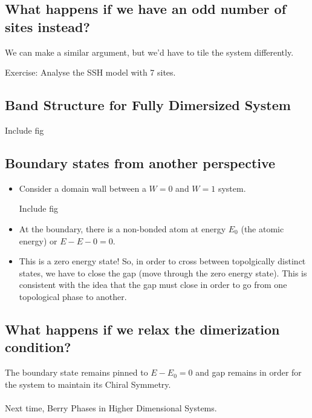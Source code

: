 \documentclass[11pt]{article}
\begin{document}
\subsection*{What happens if we have an odd number of sites instead?} We can make a similar argument, but we'd have to tile the system differently. \begin{note}
  {Exercise: Analyse the SSH model with 7 sites.}
\end{note}

\vskip 1cm
\subsection*{Band Structure for Fully Dimersized System}

\begin{center}
  Include fig
\end{center}

\subsection{Boundary states from another perspective}

\begin{itemize}
  \item Consider a domain wall between a $W = 0$ and $W = 1$ system. \begin{center}
    Include fig
  \end{center} 
  \item At the boundary, there is a non-bonded atom at energy $E_0$ (the atomic energy) or $E - E-0 = 0$.
  \item This is a zero energy state! So, in order to cross between topolgically distinct states, we have to close the gap (move through the zero energy state). This is consistent with the idea that the gap must close in order to go from one topological phase to another.
\end{itemize}

\vskip 1cm
\subsection*{What happens if we relax the dimerization condition?} The boundary state remains pinned to $E - E_0 = 0$ and gap remains in order for the system to maintain its Chiral Symmetry.
\\
\\
Next time, Berry Phases in Higher Dimensional Systems.


\pagebreak
\end{document}
